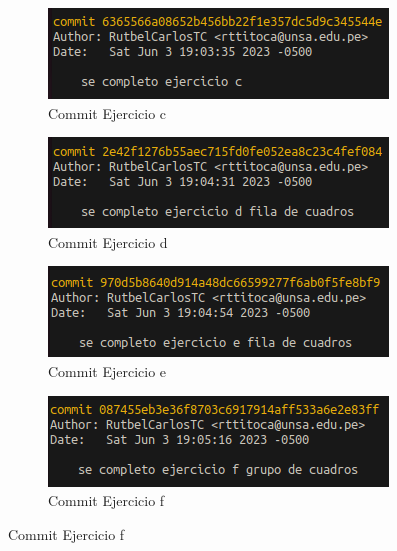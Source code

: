 \documentclass{article}
\begin{document}
\begin{itemize}
\begin{figure}[H]
      \vspace{0.5cm} %
      
      \begin{subfigure}[b]{0.4\textwidth}
        \centering
        \includegraphics[width=\textwidth]{img/commits/commitEjer-c.png}
        \caption{Commit Ejercicio c}
      \end{subfigure}
      \hfill
      \begin{subfigure}[b]{0.4\textwidth}
        \centering
        \includegraphics[width=\textwidth]{img/commits/commitEjer-d.png}
        \caption{Commit Ejercicio d}
      \end{subfigure}
      
      \vspace{0.5cm} %
      
      \begin{subfigure}[b]{0.4\textwidth}
        \centering
        \includegraphics[width=\textwidth]{img/commits/commitEjer-e.png}
        \caption{Commit Ejercicio e}
      \end{subfigure}
      \hfill
      \begin{subfigure}[b]{0.4\textwidth}
        \centering
        \includegraphics[width=\textwidth]{img/commits/commitEjer-f.png}
        \caption{Commit Ejercicio f}
      \end{subfigure}


\end{figure}
\end{itemize}
\end{document}
